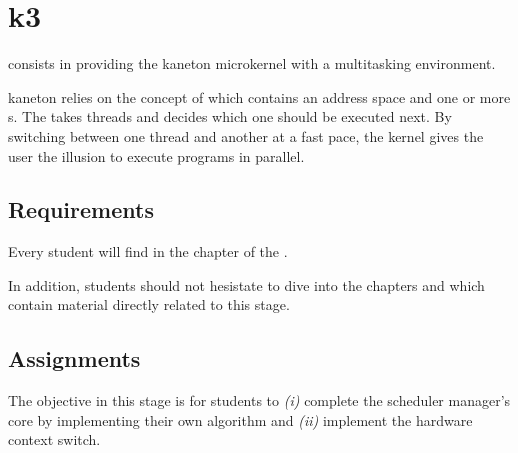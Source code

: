 %
%
%
%
%
%

%
%

\chapter{k3}
\label{chapter:k3}

 consists in providing the kaneton microkernel with a multitasking
environment.

kaneton relies on the concept of  which contains an address space
and one or more s. The  takes threads and
decides which one should be executed next. By switching between one thread and
another at a fast pace, the kernel gives the user the illusion to execute
programs in parallel.

\newpage

%
%

%
%

\section{Requirements}

Every student will find in the chapter  of the
.

In addition, students should not hesistate to dive into the chapters
 and  which contain
material directly related to this stage.

%
%

\section{Assignments}

The objective in this stage is for students to \textit{(i)} complete the
scheduler manager's core by implementing their own algorithm and \textit{(ii)}
implement the hardware  context switch.

